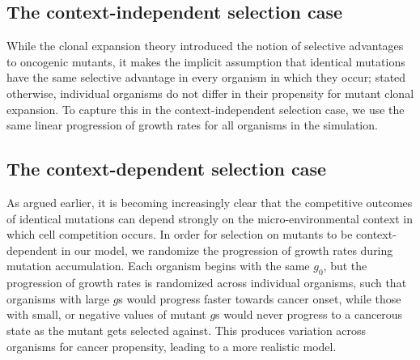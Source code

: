 \documentclass[9pt,twocolumn,twoside]{pnas-new}
\begin{document}
	\subsection*{The context-independent selection case}
	While the clonal expansion theory introduced the notion of selective advantages to oncogenic mutants, it makes the implicit assumption that identical mutations have the same selective advantage in every organism in which they occur; stated otherwise, individual organisms do not differ in their propensity for mutant clonal expansion. To capture this in the context-independent selection case, we use the same linear progression of growth rates for all organisms in the simulation.

	\subsection*{The context-dependent selection case}
	As argued earlier, it is becoming increasingly clear that the competitive outcomes of identical mutations can depend strongly on the micro-environmental context in which cell competition occurs. In order for selection on mutants to be context-dependent in our model, we randomize the progression of growth rates during mutation accumulation. Each organism begins with the same $g_{0}$, but the progression of growth rates is randomized across individual organisms, such that organisms with large $g$s would progress faster towards cancer onset, while those with small, or negative values of mutant $g$s would never progress to a cancerous state as the mutant gets selected against. This produces variation across organisms for cancer propensity, leading to a more realistic model.
\end{document}
